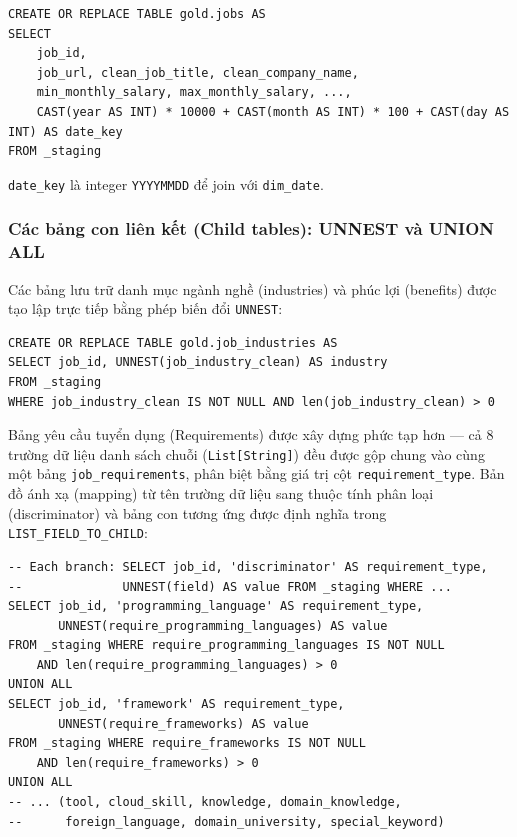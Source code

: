 \begin{lstlisting}[style=sqlstyle, caption={gold.jobs: fact table + date\_key}, label={lst:jobs-sql}]
CREATE OR REPLACE TABLE gold.jobs AS
SELECT
    job_id,
    job_url, clean_job_title, clean_company_name,
    min_monthly_salary, max_monthly_salary, ...,
    CAST(year AS INT) * 10000 + CAST(month AS INT) * 100 + CAST(day AS INT) AS date_key
FROM _staging
\end{lstlisting}

\texttt{date\_key} là integer \texttt{YYYYMMDD} để join với \texttt{dim\_date}.

\subsubsection{Các bảng con liên kết (Child tables): UNNEST và UNION ALL}

Các bảng lưu trữ danh mục ngành nghề (industries) và phúc lợi (benefits) được tạo lập trực tiếp bằng phép biến đổi \texttt{UNNEST}:

\begin{lstlisting}[style=sqlstyle, caption={job\_industries: UNNEST list}, label={lst:industries-sql}]
CREATE OR REPLACE TABLE gold.job_industries AS
SELECT job_id, UNNEST(job_industry_clean) AS industry
FROM _staging
WHERE job_industry_clean IS NOT NULL AND len(job_industry_clean) > 0
\end{lstlisting}

Bảng yêu cầu tuyển dụng (Requirements) được xây dựng phức tạp hơn — cả 8 trường dữ liệu danh sách chuỗi (\texttt{List[String]}) đều được gộp chung vào
cùng một bảng \texttt{job\_requirements}, phân biệt bằng giá trị cột \texttt{requirement\_type}. Bản đồ ánh xạ (mapping) từ tên trường dữ liệu sang thuộc tính phân loại (discriminator)
và bảng con tương ứng được định nghĩa trong \texttt{LIST\_FIELD\_TO\_CHILD}:

\begin{lstlisting}[style=sqlstyle, caption={job\_requirements: Dùng phép UNION ALL kết hợp các nhánh dữ liệu}, label={lst:requirements-sql}]
-- Each branch: SELECT job_id, 'discriminator' AS requirement_type,
--              UNNEST(field) AS value FROM _staging WHERE ...
SELECT job_id, 'programming_language' AS requirement_type,
       UNNEST(require_programming_languages) AS value
FROM _staging WHERE require_programming_languages IS NOT NULL
    AND len(require_programming_languages) > 0
UNION ALL
SELECT job_id, 'framework' AS requirement_type,
       UNNEST(require_frameworks) AS value
FROM _staging WHERE require_frameworks IS NOT NULL
    AND len(require_frameworks) > 0
UNION ALL
-- ... (tool, cloud_skill, knowledge, domain_knowledge,
--      foreign_language, domain_university, special_keyword)
\end{lstlisting}

